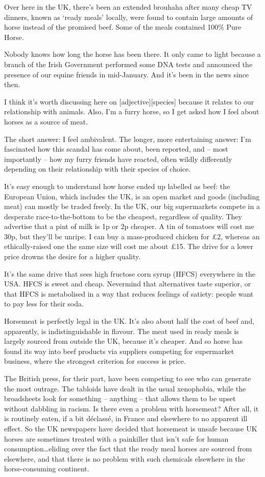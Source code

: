 
Over here in the UK, there's been an extended brouhaha after many cheap TV dinners, known as `ready meals' locally, were found to contain large amounts of horse instead of the promised beef. Some of the meals contained 100\% Pure Horse.

Nobody knows how long the horse has been there. It only came to light because a branch of the Irish Government performed some DNA tests and announced the presence of our equine friends in mid-January. And it's been in the news since then.

I think it's worth discussing here on [adjective][species] because it relates to our relationship with animals. Also, I'm a furry horse, so I get asked how I feel about horses as a source of meat.

The short answer: I feel ambivalent. The longer, more entertaining answer: I'm fascinated how this scandal has come about, been reported, and -- most importantly -- how my furry friends have reacted, often wildly differently depending on their relationship with their species of choice.

It's easy enough to understand how horse ended up labelled as beef: the European Union, which includes the UK, is an open market and goods (including meat) can mostly be traded freely. In the UK, our big supermarkets compete in a desperate race-to-the-bottom to be the cheapest, regardless of quality. They advertise that a pint of milk is 1p or 2p cheaper. A tin of tomatoes will cost me 30p, but they'll be unripe. I can buy a mass-produced chicken for £2, whereas an ethically-raised one the same size will cost me about £15. The drive for a lower price drowns the desire for a higher quality.

It's the same drive that sees high fructose corn syrup (HFCS) everywhere in the USA. HFCS is sweet and cheap. Nevermind that alternatives taste superior, or that HFCS is metabolised in a way that reduces feelings of satiety: people want to pay less for their soda.

Horsemeat is perfectly legal in the UK. It's also about half the cost of beef and, apparently, is indistinguishable in flavour. The meat used in ready meals is largely sourced from outside the UK, because it's cheaper. And so horse has found its way into beef products via suppliers competing for supermarket business, where the strongest criterion for success is price.

The British press, for their part, have been competing to see who can generate the most outrage. The tabloids have dealt in the usual xenophobia, while the broadsheets look for something -- anything -- that allows them to be upset without dabbling in racism. Is there even a problem with horsemeat? After all, it is routinely eaten, if a bit d\'{e}class\'{e}, in France and elsewhere to no apparent ill effect. So the UK newspapers have decided that horsemeat is unsafe because UK horses are sometimes treated with a painkiller that isn't safe for human consumption\ldots eliding over the fact that the ready meal horses are sourced from elsewhere, and that there is no problem with such chemicals elsewhere in the horse-consuming continent.

